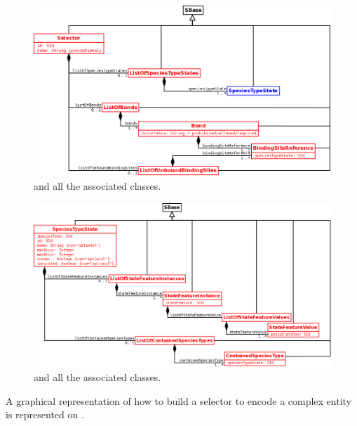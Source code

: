 \begin{figure}[H]
\begin{center}
\includegraphics[scale=0.3]{figs/pngs/SelectorGeneral.png} 
\caption{ and all the associated classes.}
\label{fig:SelectorGeneral}
\end{center}
\end{figure}


\begin{figure}[H]
\begin{center}
\includegraphics[scale=0.25]{figs/pngs/SpeciesTypeStateGeneral.png} 
\caption{ and all the associated classes.}
\label{fig:SpeciesTypeStateGeneral}
\end{center}
\end{figure}

A graphical representation of how to build a selector to encode a complex entity is represented on .

